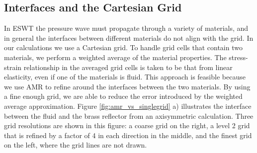 \documentclass{article}
\begin{document}
\subsection{Interfaces and the Cartesian Grid}
\label{sec:interfaces}
In ESWT the pressure wave must propagate through a variety of materials, and in general the interfaces between different materials do not align with the grid.  In our calculations we use a Cartesian grid.  To handle grid cells that contain two materials, we perform a weighted average of the material properties.  The stress-strain relationship in the averaged grid cells is taken to be that from linear elasticity, even if one of the materials is fluid.  This approach is feasible because we use AMR to refine around the interfaces between the two materials.  By using a fine enough grid, we are able to reduce the error introduced by the weighted average approximation.  Figure \ref{fig:amr_vs_singlegrid} a) illustrates the interface between the fluid and the brass reflector from an axisymmetric calculation.  Three grid resolutions are shown in this figure: a coarse grid on the right, a level 2 grid that is refined by a factor of 4 in each direction in the middle, and the finest grid on the left, where the grid lines are not drawn.
\end{document}
